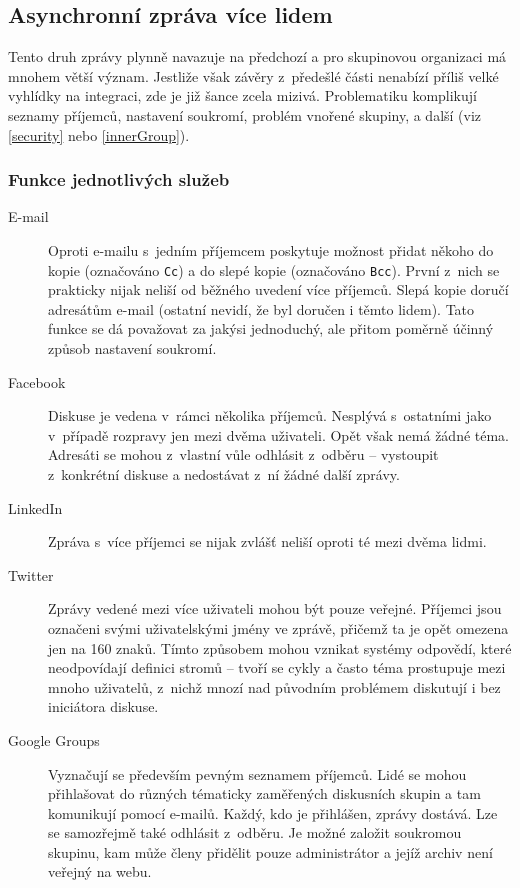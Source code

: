 \documentclass[12pt,oneside,final]{fithesis2}
\begin{document}
\subsection{Asynchronní zpráva více lidem}
Tento druh zprávy plynně navazuje na předchozí a pro skupinovou organizaci má mnohem větší význam. Jestliže však závěry z~předešlé části nenabízí příliš velké vyhlídky na integraci, zde je již šance zcela mizivá. Problematiku komplikují seznamy příjemců, nastavení soukromí, problém vnořené skupiny, a další (viz \ref{security} nebo \ref{innerGroup}).

\subsubsection*{Funkce jednotlivých služeb}
\begin{description}
    \item[E-mail]
        Oproti e-mailu s~jedním příjemcem poskytuje možnost přidat někoho do kopie (označováno {\tt Cc}) a do slepé kopie (označováno {\tt Bcc}). První z~nich se prakticky nijak neliší od běžného uvedení více příjemců. Slepá kopie doručí adresátům e-mail  (ostatní nevidí, že byl doručen i těmto lidem). Tato funkce se dá považovat za jakýsi jednoduchý, ale přitom poměrně účinný způsob nastavení soukromí.

    \item[Facebook]
        Diskuse je vedena v~rámci několika příjemců. Nesplývá s~ostatními jako v~případě rozpravy jen mezi dvěma uživateli. Opět však nemá žádné téma. Adresáti se mohou z~vlastní vůle odhlásit z~odběru -- vystoupit z~konkrétní diskuse a nedostávat z~ní žádné další zprávy.

    \item[LinkedIn]
        Zpráva s~více příjemci se nijak zvlášť neliší oproti té mezi dvěma lidmi.

    \item[Twitter]
        Zprávy vedené mezi více uživateli mohou být pouze veřejné. Příjemci jsou označeni svými uživatelskými jmény ve zprávě, přičemž ta je opět omezena jen na 160 znaků. Tímto způsobem mohou vznikat systémy odpovědí, které neodpovídají definici stromů -- tvoří se cykly a často téma prostupuje mezi mnoho uživatelů, z~nichž mnozí nad původním problémem diskutují i bez iniciátora diskuse.

    \item[Google Groups]
        Vyznačují se především pevným seznamem příjemců. Lidé se mohou přihlašovat do různých tématicky zaměřených diskusních skupin a tam komunikují pomocí e-mailů. Každý, kdo je přihlášen, zprávy dostává. Lze se samozřejmě také odhlásit z~odběru. Je možné založit soukromou skupinu, kam může členy přidělit pouze administrátor a jejíž archiv není veřejný na webu.


\end{description}
\end{document}
